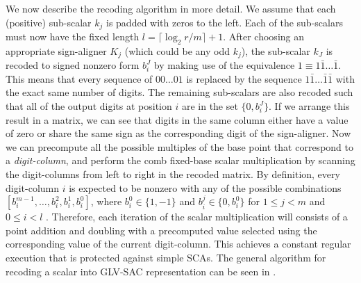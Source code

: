 We now describe the recoding algorithm in more detail.
We assume that each (positive) sub-scalar $k_j$ is padded with zeros to the left.
Each of the sub-scalars must now have the fixed length $l = \lceil \log_2 r/m \rceil + 1$. 
After choosing an appropriate sign-aligner $K_j$ (which could be any odd $k_j$), the sub-scalar $k_J$ is recoded to signed nonzero form $b_i^J$ by making use of the equivalence $1 \equiv 1\bar{1} \ldots \bar{1}$.
This means that every sequence of $00\ldots 01$ is replaced by the sequence $1\bar{1}\ldots \bar{1}\bar{1}$ with the exact same number of digits.
The remaining sub-scalars are also recoded such that all of the output digits at position $i$ are in the set $\{0, b_i^J\}$. If we arrange this result in a matrix, we can see that digits in the same column either have a value of zero or share the same sign as the corresponding digit of the sign-aligner.
Now we can precompute all the possible multiples of the base point that correspond to a \emph{digit-column},
and perform the comb fixed-base scalar multiplication by scanning the digit-columns from left to right in the recoded matrix. 
By definition, every digit-column $i$ is expected to be nonzero with any of the possible combinations $[b_i^{m - 1}, \ldots, b_i^2, b_i^1, b_i^0]$, where $b_i^0 \in \{1, -1\}$ and $b_i^j \in \{0, b_i^0\}$ for $1 \le j < m$ and $0 \le i < l$ \cite{faz2015efficient}.
Therefore, each iteration of the scalar multiplication will consists of a point addition and doubling with a precomputed value selected using the corresponding value of the current digit-column.
This achieves a constant regular execution that is protected against simple SCAs.
The general algorithm for recoding a scalar into GLV-SAC representation can be seen in .
%
